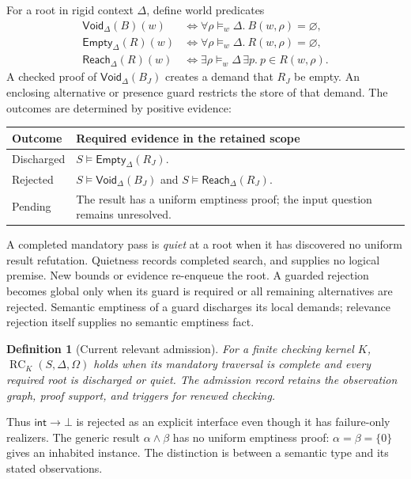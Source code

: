 \documentclass[10pt,a4paper]{article}
\newcommand{\Int}{\mathsf{int}}
\newcommand{\RC}{\operatorname{RC}}
\newcommand{\Void}{\mathsf{Void}}
\newcommand{\Empty}{\mathsf{Empty}}
\newcommand{\Reach}{\mathsf{Reach}}
\newtheorem{definition}{Definition}[section]
\theoremstyle{remark}
\begin{document}
For a root in rigid context $\Delta$, define world predicates
\begin{align*}
 \Void_\Delta(B)(w)&\iff
       \forall\rho\models_w\Delta.\ B(w,\rho)=\varnothing,\\
 \Empty_\Delta(R)(w)&\iff
       \forall\rho\models_w\Delta.\ R(w,\rho)=\varnothing,\\
 \Reach_\Delta(R)(w)&\iff
       \exists\rho\models_w\Delta\,\exists p.\ p\in R(w,\rho).
\end{align*}
A checked proof of $\Void_\Delta(B_J)$ creates a demand that $R_J$ be empty.
An enclosing alternative or presence guard restricts the store of that demand.
The outcomes are determined by positive evidence:
\begin{center}
\begin{tabularx}{\linewidth}{@{}P{23mm}Y@{}}
\toprule
Outcome & Required evidence in the retained scope \\\midrule
Discharged & $S\models\Empty_\Delta(R_J)$. \\
Rejected & $S\models\Void_\Delta(B_J)$ and
           $S\models\Reach_\Delta(R_J)$. \\
Pending & The result has a uniform emptiness proof; the input question
          remains unresolved. \\\bottomrule
\end{tabularx}
\end{center}
A completed mandatory pass is \emph{quiet} at a root when it has discovered no
uniform result refutation. Quietness records completed search, and supplies
no logical premise. New bounds or evidence re-enqueue the root. A guarded
rejection becomes global only when its guard is required or all remaining
alternatives are rejected. Semantic emptiness of a guard discharges its local
demands; relevance rejection itself supplies no semantic emptiness fact.

\begin{definition}[Current relevant admission]\label{def:relevance}
For a finite checking kernel $K$, $\RC_K(S,\Delta,\Omega)$ holds when its
mandatory traversal is complete and every required root is discharged or quiet.
The admission record retains the observation graph, proof support, and triggers
for renewed checking.
\end{definition}

Thus $\Int\to\bot$ is rejected as an explicit interface even though it has
failure-only realizers. The generic result $\alpha\land\beta$ has no
uniform emptiness proof: $\alpha=\beta=\{0\}$ gives an inhabited instance.
The distinction is between a semantic type and its stated observations.
\end{document}
